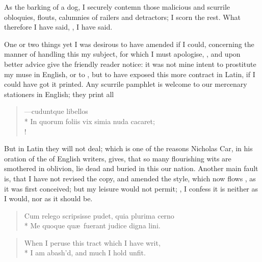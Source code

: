 {As the barking of a dog, I securely contemn those malicious and
scurrile obloquies, flouts, calumnies of railers and detractors; I
scorn the rest. What therefore I have said, , I have
said.

One or two things yet I was desirous to have amended if I could,
concerning the manner of handling this my subject, for which I must
apologise, , and upon better advice give the friendly reader
notice: it was not mine intent to prostitute my muse in English, or to
, but to have exposed this more contract in
Latin, if I could have got it printed. Any scurrile pamphlet is welcome
to our mercenary stationers in English; they print all

\begin{latin}
\begin{verse}
---cuduntque libellos\\*
In quorum foliis vix simia nuda cacaret;\\!
\end{verse}
\end{latin}

But in Latin they will not deal; which is one of the reasons
Nicholas Car, in his oration of the  of English writers,
gives, that so many flourishing wits are smothered in oblivion, lie
dead and buried in this our nation. Another main fault is, that I have
not revised the copy, and amended the style, which now flows ,
as it was first conceived; but my leisure would not permit; , I confess it is neither as I would, nor as
it should be.
%
\begin{verse}
Cum relego scripsisse pudet, quia plurima cerno\\*
Me quoque qu\ae{}\ fuerant judice digna lini.
\end{verse}
\translationrule
\begin{verse}
When I peruse this tract which I have writ,\\*
I am abash'd, and much I hold unfit.
\end{verse}

}

